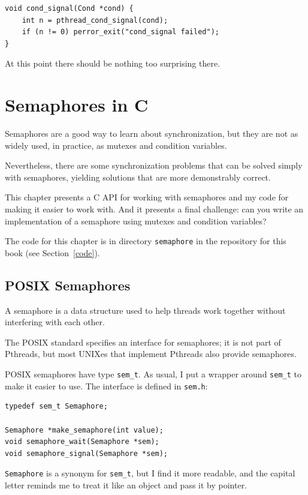 \documentclass[12pt]{book}
\begin{document}
{\begin{verbatim}
void cond_signal(Cond *cond) {
    int n = pthread_cond_signal(cond);
    if (n != 0) perror_exit("cond_signal failed");
}
\end{verbatim}

At this point there should be nothing too surprising there.



\chapter{Semaphores in C}

Semaphores are a good way to learn about synchronization, but
they are not as widely used, in practice, as mutexes and
condition variables.

Nevertheless, there are some synchronization problems that can be
solved simply with semaphores, yielding solutions that are more
demonstrably correct.

This chapter presents a C API for working with semaphores and
my code for making it easier to work with.  And it presents
a final challenge: can you write an implementation of a semaphore
using mutexes and condition variables?

The code for this chapter is in directory {\tt semaphore} in the
repository for this book (see Section~\ref{code}).


\section{POSIX Semaphores}

A semaphore is a data structure used to help threads work together
without interfering with each other.

The POSIX standard specifies an interface for semaphores;
it is not part of Pthreads, but most UNIXes
that implement Pthreads also provide semaphores.

POSIX semaphores have type {\tt sem\_t}.
As usual, I put a wrapper around {\tt sem\_t}
to make it easier to use.  The interface is defined in {\tt sem.h}:

\begin{verbatim}
typedef sem_t Semaphore;

Semaphore *make_semaphore(int value);
void semaphore_wait(Semaphore *sem);
void semaphore_signal(Semaphore *sem);
\end{verbatim}

{\tt Semaphore} is a synonym for \verb"sem_t", but I find it more
readable, and the capital letter reminds me to treat it like an
object and pass it by pointer.

}
\end{document}
